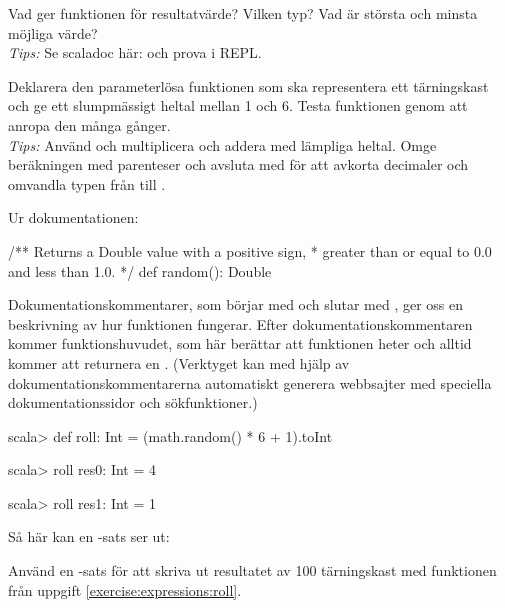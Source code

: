 \QUESTEND



\QUESTBEGIN

\Task\label{exercise:expressions:roll} \what

\Subtask Vad ger funktionen  för resultatvärde? Vilken typ? Vad är största och minsta möjliga värde?
\\\emph{Tips:} Se scaladoc här: \Scaladoc och prova i REPL.

\Subtask Deklarera den parameterlösa funktionen  som ska representera ett tärningskast och ge ett slumpmässigt heltal mellan 1 och 6. Testa funktionen genom att anropa den många gånger. \\\emph{Tips:} Använd  och multiplicera och addera med lämpliga heltal. Omge beräkningen med parenteser och avsluta med  för att avkorta decimaler och omvandla typen från  till .

\SOLUTION

\TaskSolved \what

\SubtaskSolved Ur dokumentationen:
\begin{Code}
/** Returns a Double value with a positive sign,
 *  greater than or equal to 0.0 and less than 1.0.
 */
def random(): Double
\end{Code}
Dokumentationskommentarer, som börjar med \code{/**} och slutar med \code{*/}, ger oss en beskrivning av hur funktionen fungerar. Efter dokumentationskommentaren kommer funktionshuvudet, som här berättar att funktionen heter  och alltid kommer att returnera en . (Verktyget  kan med hjälp av  dokumentationskommentarerna automatiskt generera webbsajter med speciella  dokumentationssidor och sökfunktioner.)

\SubtaskSolved
\begin{REPL}
scala> def roll: Int = (math.random() * 6 + 1).toInt

scala> roll
res0: Int = 4

scala> roll
res1: Int = 1
\end{REPL}

\QUESTEND





\QUESTBEGIN

\Task \what

\Subtask Så här kan en -sats ser ut:
Använd en -sats för att skriva ut resultatet av 100 tärningskast med funktionen  från uppgift \ref{exercise:expressions:roll}.

